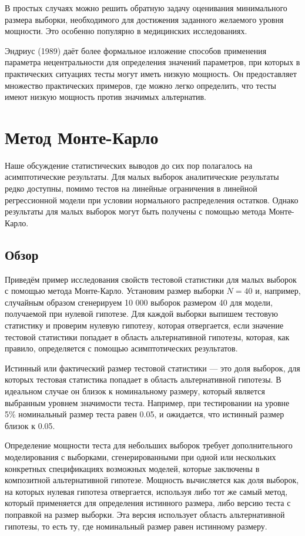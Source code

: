 В простых случаях можно решить обратную задачу оценивания минимального размера выборки, необходимого для достижения заданного желаемого уровня мощности. Это особенно популярно в медицинских исследованиях. 

Эндриус (1989) даёт более формальное изложение способов применения параметра нецентральности для определения значений параметров, при которых в практических ситуациях тесты могут иметь низкую мощность. Он предоставляет множество практических примеров, где можно легко определить, что тесты имеют низкую мощность против значимых альтернатив.

\section{Метод Монте-Карло}

Наше обсуждение статистических выводов до сих пор полагалось на асимптотические результаты. Для малых выборок аналитические результаты редко доступны, помимо тестов на линейные ограничения в линейной регрессионной модели при условии нормального распределения остатков. Однако результаты для малых выборок могут быть получены с помощью метода Монте-Карло.

\subsection{Обзор}

Приведём пример исследования свойств тестовой статистики для малых выборок с помощью метода Монте-Карло. Установим размер выборки $N = 40$ и, например, случайным образом сгенерируем 10 000 выборок размером 40 для модели, получаемой при нулевой гипотезе. Для каждой выборки выпишем тестовую статистику и проверим нулевую гипотезу, которая отвергается, если значение тестовой статистики попадает в область альтернативной гипотезы, которая, как правило, определяется с помощью асимптотических результатов.

Истинный или фактический размер тестовой статистики --- это доля выборок, для которых тестовая статистика попадает в область альтернативной гипотезы. В идеальном случае он близок к номинальному размеру, который является выбранным уровнем значимости теста. Например, при тестировании на уровне 5\% номинальный размер теста равен 0.05, и ожидается, что истинный размер близок к 0.05.

Определение мощности теста для небольших выборок требует дополнительного моделирования с выборками, сгенерированными при одной или нескольких конкретных спецификациях возможных моделей, которые заключены в композитной альтернативной гипотезе. Мощность вычисляется как доля выборок, на которых нулевая гипотеза отвергается, используя либо тот же самый метод, который применяется для определения истинного размера, либо версию теста с поправкой на размер выборки. Эта версия использует область альтернативной гипотезы, то есть ту, где номинальный размер равен истинному размеру.


